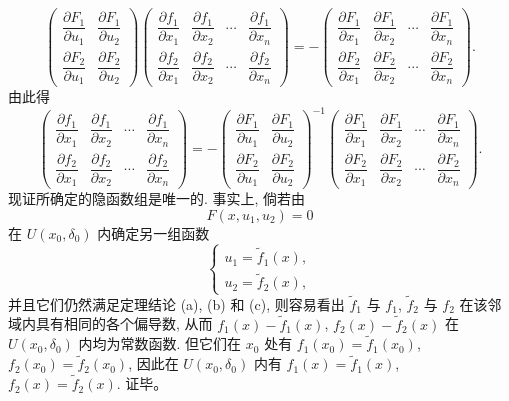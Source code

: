 \documentclass[UTF8,12pt,a4paper,fontset=fandol]{ctexart}
\begin{document}
\[
  \begin{pmatrix}
    \dfrac{\partial F_1}{\partial u_1} &
    \dfrac{\partial F_1}{\partial u_2}\\
    \dfrac{\partial F_2}{\partial u_1} &
    \dfrac{\partial F_2}{\partial u_2}
  \end{pmatrix}
  \begin{pmatrix}
    \dfrac{\partial f_1}{\partial x_1} &
    \dfrac{\partial f_1}{\partial x_2} &
    \cdots &
    \dfrac{\partial f_1}{\partial x_n}\\
    \dfrac{\partial f_2}{\partial x_1} &
    \dfrac{\partial f_2}{\partial x_2} &
    \cdots &
    \dfrac{\partial f_2}{\partial x_n}
  \end{pmatrix}
  =-
  \begin{pmatrix}
    \dfrac{\partial F_1}{\partial x_1} &
    \dfrac{\partial F_1}{\partial x_2} &
    \cdots &
    \dfrac{\partial F_1}{\partial x_n}\\
    \dfrac{\partial F_2}{\partial x_1} &
    \dfrac{\partial F_2}{\partial x_2} &
    \cdots &
    \dfrac{\partial F_2}{\partial x_n}
  \end{pmatrix}.
\]
由此得
\[
  \begin{pmatrix}
    \dfrac{\partial f_1}{\partial x_1} &
    \dfrac{\partial f_1}{\partial x_2} &
    \cdots &
    \dfrac{\partial f_1}{\partial x_n}\\
    \dfrac{\partial f_2}{\partial x_1} &
    \dfrac{\partial f_2}{\partial x_2} &
    \cdots &
    \dfrac{\partial f_2}{\partial x_n}
  \end{pmatrix}
  =-
  \begin{pmatrix}
    \dfrac{\partial F_1}{\partial u_1} &
    \dfrac{\partial F_1}{\partial u_2}\\
    \dfrac{\partial F_2}{\partial u_1} &
    \dfrac{\partial F_2}{\partial u_2}
  \end{pmatrix}^{-1}
  \begin{pmatrix}
    \dfrac{\partial F_1}{\partial x_1} &
    \dfrac{\partial F_1}{\partial x_2} &
    \cdots &
    \dfrac{\partial F_1}{\partial x_n}\\
    \dfrac{\partial F_2}{\partial x_1} &
    \dfrac{\partial F_2}{\partial x_2} &
    \cdots &
    \dfrac{\partial F_2}{\partial x_n}
  \end{pmatrix}.
\]
现证所确定的隐函数组是唯一的. 事实上, 倘若由
\[
  F(x,u_1,u_2)=0
\]
在 $U(x_0,\delta_0)$ 内确定另一组函数
\[
  \begin{cases}
    u_1=\tilde f_1(x),\\
    u_2=\tilde f_2(x),
  \end{cases}
\]
并且它们仍然满足定理结论 (a), (b) 和 (c), 则容易看出 $\tilde f_1$ 与 $f_1$, $\tilde f_2$ 与 $f_2$ 在该邻域内具有相同的各个偏导数, 从而 $f_1(x)-\tilde f_1(x)$, $f_2(x)-\tilde f_2(x)$ 在 $U(x_0,\delta_0)$ 内均为常数函数. 但它们在 $x_0$ 处有 $f_1(x_0)=\tilde f_1(x_0)$, $f_2(x_0)=\tilde f_2(x_0)$, 因此在 $U(x_0,\delta_0)$ 内有 $f_1(x)=\tilde f_1(x)$, $f_2(x)=\tilde f_2(x)$. 证毕。
\end{document}
